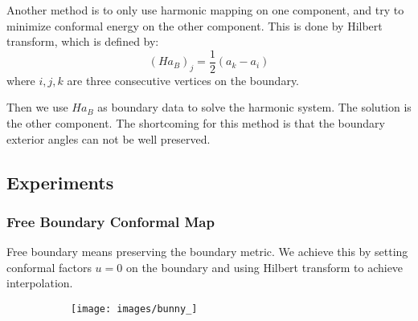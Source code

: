 Another method is to only use harmonic mapping on one component, and try to minimize conformal energy on the other component. This is done by Hilbert transform, which is defined by:
\begin{equation}
(\mathit{H}a_B)_j = \frac{1}{2}(a_k - a_i)
\end{equation}
where $i,j,k$ are three consecutive vertices on the boundary.

Then we use $\mathit{H}a_B$ as boundary data to solve the harmonic system. The solution is the other component. 
The shortcoming for this method is that the boundary exterior angles can not be well preserved.

\subsection{Experiments}
\subsubsection{Free Boundary Conformal Map}
Free boundary means preserving the boundary metric. We achieve this by setting conformal factors $u = 0$ on the boundary and using Hilbert transform to achieve interpolation. 

\begin{figure}
\centering
\begin{subfigure}{0.4\textwidth}
\texttt{[image: images/bunny\_]}
\end{subfigure}
\end{figure}













